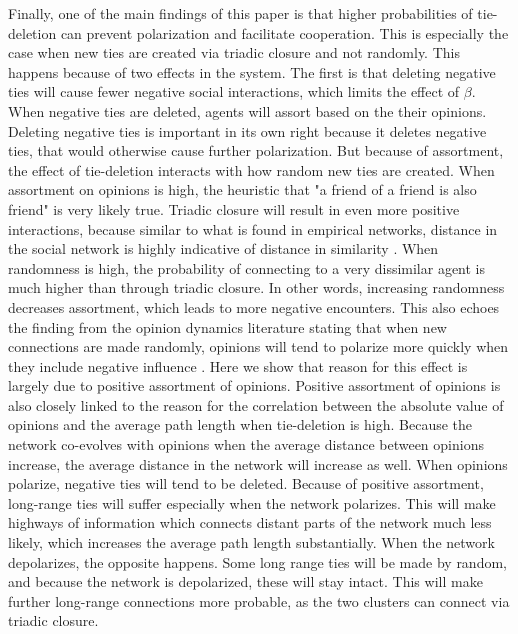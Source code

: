 \documentclass{article}
\begin{document}
Finally, one of the main findings of this paper is that higher probabilities of tie-deletion can prevent polarization and facilitate cooperation. This is especially the case when new ties are created via triadic closure and not randomly. This happens because of two effects in the system. The first is that deleting negative ties will cause fewer negative social interactions, which limits the effect of $\beta$. When negative ties are deleted, agents will assort based on the their opinions. 
Deleting negative ties is important in its own right because it deletes negative ties, that would otherwise cause further polarization. But because of assortment, the effect of tie-deletion interacts with how random new ties are created. When assortment on opinions is high, the heuristic that "a friend of a friend is also friend" is very likely true. Triadic closure will result in even more positive interactions, because similar to what is found in empirical networks, distance in the social network is highly indicative of distance in similarity \cite{kossinets_origins_2009}. When randomness is high, the probability of connecting to a very dissimilar agent is much higher than through triadic closure. In other words, increasing randomness decreases assortment, which leads to more negative encounters. This also echoes the finding from the opinion dynamics literature stating that when new connections are made randomly, opinions will tend to polarize more quickly when they include negative influence \cite{flache_why_2006,flache_small_2011,turner_paths_2018}. Here we show that reason for this effect is largely due to positive assortment of opinions. 
Positive assortment of opinions is also closely linked to the reason for the correlation between the absolute value of opinions and the average path length when tie-deletion is high. Because the network co-evolves with opinions when the average distance between opinions increase, the average distance in the network will increase as well. When opinions polarize, negative ties will tend to be deleted. Because of positive assortment, long-range ties will suffer especially when the network polarizes. This will make highways of information which connects distant parts of the network much less likely, which increases the average path length substantially. When the network depolarizes, the opposite happens. Some long range ties will be made by random, and because the network is depolarized, these will stay intact. This will make further long-range connections more probable, as the two clusters can connect via triadic closure.
\end{document}
